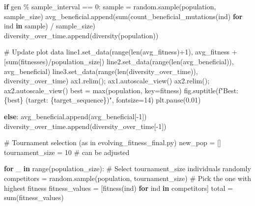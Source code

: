 \documentclass[
  letterpaper,
  DIV=11,
  numbers=noendperiod]{scrreprt}
\newenvironment{Shaded}{\begin{snugshade}}{\end{snugshade}}
\newcommand{\BuiltInTok}[1]{\textcolor[rgb]{0.00,0.23,0.31}{#1}}
\newcommand{\CommentTok}[1]{\textcolor[rgb]{0.37,0.37,0.37}{#1}}
\newcommand{\ControlFlowTok}[1]{\textcolor[rgb]{0.00,0.23,0.31}{\textbf{#1}}}
\newcommand{\DecValTok}[1]{\textcolor[rgb]{0.68,0.00,0.00}{#1}}
\newcommand{\FloatTok}[1]{\textcolor[rgb]{0.68,0.00,0.00}{#1}}
\newcommand{\KeywordTok}[1]{\textcolor[rgb]{0.00,0.23,0.31}{\textbf{#1}}}
\newcommand{\NormalTok}[1]{\textcolor[rgb]{0.00,0.23,0.31}{#1}}
\newcommand{\OperatorTok}[1]{\textcolor[rgb]{0.37,0.37,0.37}{#1}}
\newcommand{\SpecialCharTok}[1]{\textcolor[rgb]{0.37,0.37,0.37}{#1}}
\newcommand{\SpecialStringTok}[1]{\textcolor[rgb]{0.13,0.47,0.30}{#1}}
\theoremstyle{definition}
\theoremstyle{remark}
\begin{document}
\begin{tcolorbox}
\begin{Shaded}
\begin{Highlighting}[]
    \ControlFlowTok{if}\NormalTok{ gen }\OperatorTok{\%}\NormalTok{ sample\_interval }\OperatorTok{==} \DecValTok{0}\NormalTok{:}
\NormalTok{        sample }\OperatorTok{=}\NormalTok{ random.sample(population, sample\_size)}
\NormalTok{        avg\_beneficial.append(}\BuiltInTok{sum}\NormalTok{(count\_beneficial\_mutations(ind) }\ControlFlowTok{for}\NormalTok{ ind }\KeywordTok{in}\NormalTok{ sample) }\OperatorTok{/}\NormalTok{ sample\_size)}
\NormalTok{        diversity\_over\_time.append(diversity(population))}

        \CommentTok{\# Update plot data}
\NormalTok{        line1.set\_data(}\BuiltInTok{range}\NormalTok{(}\BuiltInTok{len}\NormalTok{(avg\_fitness)}\OperatorTok{+}\DecValTok{1}\NormalTok{), avg\_fitness }\OperatorTok{+}\NormalTok{ [}\BuiltInTok{sum}\NormalTok{(fitnesses)}\OperatorTok{/}\NormalTok{population\_size])}
\NormalTok{        line2.set\_data(}\BuiltInTok{range}\NormalTok{(}\BuiltInTok{len}\NormalTok{(avg\_beneficial)), avg\_beneficial)}
\NormalTok{        line3.set\_data(}\BuiltInTok{range}\NormalTok{(}\BuiltInTok{len}\NormalTok{(diversity\_over\_time)), diversity\_over\_time)}
\NormalTok{        ax1.relim()}\OperatorTok{;}\NormalTok{ ax1.autoscale\_view()}
\NormalTok{        ax2.relim()}\OperatorTok{;}\NormalTok{ ax2.autoscale\_view()}
\NormalTok{        best }\OperatorTok{=} \BuiltInTok{max}\NormalTok{(population, key}\OperatorTok{=}\NormalTok{fitness)}
\NormalTok{        fig.suptitle(}\SpecialStringTok{f"Best: }\SpecialCharTok{\{}\NormalTok{best}\SpecialCharTok{\}}\SpecialStringTok{ (target: }\SpecialCharTok{\{}\NormalTok{target\_sequence}\SpecialCharTok{\}}\SpecialStringTok{)"}\NormalTok{, fontsize}\OperatorTok{=}\DecValTok{14}\NormalTok{)}
\NormalTok{        plt.pause(}\FloatTok{0.01}\NormalTok{)}

    \ControlFlowTok{else}\NormalTok{:}
\NormalTok{        avg\_beneficial.append(avg\_beneficial[}\OperatorTok{{-}}\DecValTok{1}\NormalTok{])}
\NormalTok{        diversity\_over\_time.append(diversity\_over\_time[}\OperatorTok{{-}}\DecValTok{1}\NormalTok{])}

    \CommentTok{\# Tournament selection (as in evolving\_fitness\_final.py)}
\NormalTok{    new\_pop }\OperatorTok{=}\NormalTok{ []}
\NormalTok{    tournament\_size }\OperatorTok{=} \DecValTok{10}  \CommentTok{\# can be adjusted}

    \ControlFlowTok{for}\NormalTok{ \_ }\KeywordTok{in} \BuiltInTok{range}\NormalTok{(population\_size):}
        \CommentTok{\# Select tournament\_size individuals randomly}
\NormalTok{        competitors }\OperatorTok{=}\NormalTok{ random.sample(population, tournament\_size)}
        \CommentTok{\# Pick the one with highest fitness}
\NormalTok{        fitness\_values }\OperatorTok{=}\NormalTok{ [fitness(ind) }\ControlFlowTok{for}\NormalTok{ ind }\KeywordTok{in}\NormalTok{ competitors]}
\NormalTok{        total }\OperatorTok{=} \BuiltInTok{sum}\NormalTok{(fitness\_values)}
        

\end{Highlighting}
\end{Shaded}
\end{tcolorbox}
\end{document}

